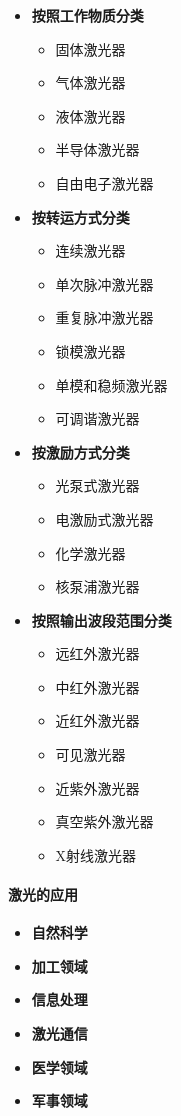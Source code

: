 \begin{multicols}{2}
	\begin{itemize}
		\item \textbf{按照工作物质分类} 
			\begin{itemize}
				\item 固体激光器
				\item 气体激光器
				\item 液体激光器
				\item 半导体激光器
				\item 自由电子激光器
			\end{itemize} %
		\item \textbf{按转运方式分类}
			\begin{itemize}
				\item 连续激光器
				\item 单次脉冲激光器
				\item 重复脉冲激光器
				\item 锁模激光器
				\item 单模和稳频激光器
				\item 可调谐激光器
			\end{itemize} %
		\item \textbf{按激励方式分类}
			\begin{itemize}
				\item 光泵式激光器
				\item 电激励式激光器
				\item 化学激光器
				\item 核泵浦激光器
			\end{itemize} %
		\item \textbf{按照输出波段范围分类}
			\begin{itemize}
				\item 远红外激光器
				\item 中红外激光器
				\item 近红外激光器
				\item 可见激光器
				\item 近紫外激光器
				\item 真空紫外激光器
				\item X射线激光器
			\end{itemize} %
	\end{itemize}
\end{multicols}

\paragraph{激光的应用}\begin{itemize}
	\item \textbf{自然科学}
	\item \textbf{加工领域}
	\item \textbf{信息处理}
	\item \textbf{激光通信}
	\item \textbf{医学领域}
	\item \textbf{军事领域}
\end{itemize}

